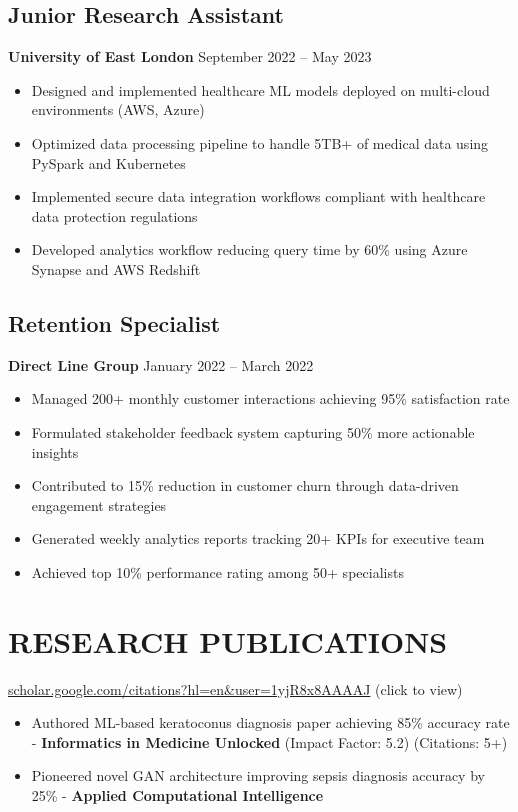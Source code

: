 \documentclass[10pt,a4paper]{article}
\begin{document}
\subsection*{Junior Research Assistant}
\textbf{University of East London} \hfill September 2022 -- May 2023
\begin{itemize}
    \item Designed and implemented healthcare ML models deployed on multi-cloud environments (AWS, Azure)
    \item Optimized data processing pipeline to handle 5TB+ of medical data using PySpark and Kubernetes
    \item Implemented secure data integration workflows compliant with healthcare data protection regulations
    \item Developed analytics workflow reducing query time by 60\% using Azure Synapse and AWS Redshift
\end{itemize}

\subsection*{Retention Specialist}
\textbf{Direct Line Group} \hfill January 2022 -- March 2022
\begin{itemize}
    \item Managed 200+ monthly customer interactions achieving 95\% satisfaction rate
    \item Formulated stakeholder feedback system capturing 50\% more actionable insights
    \item Contributed to 15\% reduction in customer churn through data-driven engagement strategies
    \item Generated weekly analytics reports tracking 20+ KPIs for executive team
    \item Achieved top 10\% performance rating among 50+ specialists
\end{itemize}

\section*{RESEARCH PUBLICATIONS}
\href{https://scholar.google.com/citations?hl=en&user=1yjR8x8AAAAJ}{scholar.google.com/citations?hl=en\&user=1yjR8x8AAAAJ} {\small\color{secondary}(click to view)}
\begin{itemize}
    \item Authored ML-based keratoconus diagnosis paper achieving 85\% accuracy rate - \textbf{Informatics in Medicine Unlocked} (Impact Factor: 5.2) (Citations: 5+)
    \item Pioneered novel GAN architecture improving sepsis diagnosis accuracy by 25\% - \textbf{Applied Computational Intelligence}
\end{itemize}
\end{document}
